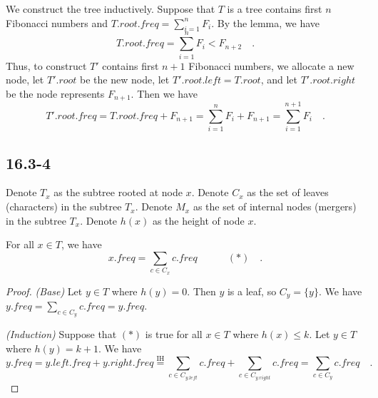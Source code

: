We construct the tree inductively.
Suppose that $T$ is a tree contains first $n$ Fibonacci numbers and
$T.root.freq = \sum\limits_{i = 1}^n F_i$.
By the lemma, we have 
\begin{equation*}
    T.root.freq = \sum\limits_{i = 1}^n F_i < F_{n + 2}
    \quad .
\end{equation*}
Thus, to construct $T'$ contains first $n + 1$ Fibonacci numbers,
we allocate a new node, let $T'.root$ be the new node,
let $T'.root.left = T.root$, and let $T'.root.right$ be the node represents $F_{n + 1}$.
Then we have 
\begin{equation*}
    T'.root.freq = T.root.freq + F_{n + 1} 
    = \sum\limits_{i = 1}^n F_i + F_{n + 1} 
    = \sum\limits_{i = 1}^{n + 1} F_i
    \quad .
\end{equation*}

\subsection*{16.3-4}

Denote $T_x$ as the subtree rooted at node $x$.
Denote $C_x$ as the set of leaves (characters) in the subtree $T_x$.
Denote $M_x$ as the set of internal nodes (mergers) in the subtree $T_x$.
Denote $h(x)$ as the height of node $x$.

\begin{lemma}
    For all $x \in T$, we have 
    \begin{equation*}
        x.freq = \sum\limits_{c \in C_x} c.freq
        \quad\quad\quad (*)
        \quad .
    \end{equation*}
\end{lemma}

\begin{proof}
    \textit{(Base)}
    Let $y \in T$ where $h(y) = 0$.
    Then $y$ is a leaf, so $C_y = \{ y \}$.
    We have $y.freq = \sum\limits_{c \in C_y} c.freq = y.freq$.

    \textit{(Induction)}
    Suppose that $(*)$ is true for all $x \in T$ where $h(x) \leq k$.
    Let $y \in T$ where $h(y) = k + 1$.
    We have 
    \begin{equation*}
        y.freq = y.left.freq + y.right.freq
        \overset{\text{IH}}{=} 
        \sum\limits_{c \in C_{y.left}} c.freq 
        + \sum\limits_{c \in C_{y.right}} c.freq
        = \sum\limits_{c \in C_y} c.freq
        \quad .
    \end{equation*}
\end{proof}

